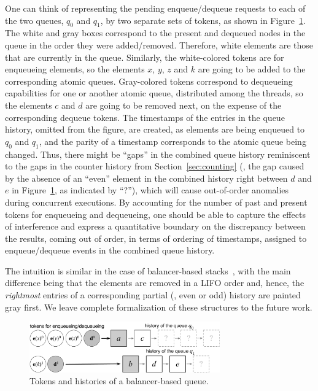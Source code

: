 %
One can think of representing the pending enqueue/dequeue requests to
each of the two queues, $q_0$ and $q_1$, by two separate sets of
tokens, as shown in Figure~\ref{fig:chist2}.
%
The white and gray boxes correspond to the present and
dequeued nodes in the queue in the order they were added/removed.
%
Therefore, white elements are those that are currently in the queue.
%
Similarly, the white-colored tokens are for enqueueing elements, so
the elements $x$, $y$, $z$ and $k$ are going to be added to the
corresponding atomic queues. Gray-colored tokens correspond to
dequeueing capabilities for one or another atomic queue, distributed
among the threads, so the elements $c$ and $d$ are going to be removed
next, on the expense of the corresponding dequeue tokens.
%
The timestamps of the entries in the queue history, omitted from the
figure, are created, as elements are being enqueued to $q_0$ and
$q_1$, and the parity of a timestamp corresponds to the atomic queue
being changed. Thus, there might be ``gaps'' in the combined queue
history reminiscent to the gaps in the counter history from
Section~\ref{sec:counting} (\eg, the gap caused by the absence of an
``even'' element in the combined history right between $d$ and $e$ in
Figure~\ref{fig:chist2}, as indicated by ``?''), which will cause
out-of-order anomalies during concurrent executions.
%
%
By accounting for the number of past and present tokens for enqueueing
and dequeueing, one should be able to capture the effects of
interference and express a quantitative boundary on the discrepancy
between the results, coming out of order, in terms of ordering of
timestamps, assigned to enqueue/dequeue events in the combined queue
history.

The intuition is similar in the case of balancer-based
stacks~\cite{Jagadeesan-Riely:ICALP14}, with the main difference being
that the elements are removed in a LIFO order and, hence, the
\emph{rightmost} entries of a corresponding partial (\ie, even or odd)
history are painted gray first.
%
We leave complete formalization of these structures to the future
work.

{
\setlength{\belowcaptionskip}{-10pt}
\begin{figure}
\centering
\includegraphics[width=8.2cm]{chist2.pdf}      
\caption{Tokens and histories of a balancer-based queue.}
\label{fig:chist2}
\end{figure}
}





